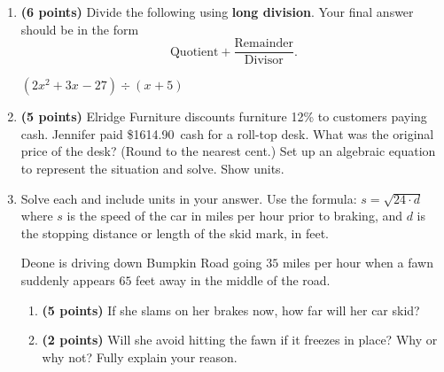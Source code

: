 \documentclass[12pt]{amsart}
\begin{document}
\begin{enumerate}
  
\vfill \vfill \vfill
\def \a{5}\def \b{2}\def \c{-7}\def \r{8}\def \monicpol{x^{}+5}\def \longnbad{2x^{2}+3x^{}-27}\def \anspol{2x^{}-7}
\item {\bf (6 points)} 
 Divide the following using {\bf long division}. Your final answer should be in the form $$ \text{Quotient} + \dfrac{\text{Remainder}}{\text{Divisor}}.$$

\vspace{3mm}

$(\longnbad) \div (\monicpol)$

\vfill  \vfill \vfill
\newpage\def \discount{12}\def \paid{1614.90}\def \rainy{10.76}\def \orcost{1835.11}\def \purcost{1441.88}\def \orrainy{12.23}
\item {\bf (5 points)} 
 Elridge Furniture discounts furniture \discount\% to customers paying cash. Jennifer paid \$\paid\ cash for a roll-top desk. What was the original price of the desk? (Round to the nearest cent.) Set up an algebraic equation to represent the situation and solve. Show units.

\vfill 
\def \insvar{24}\def \d{65}\def \zerospeed{39.5}\def \slimit{35}\def \s{53}\def \skidd{117.042}\def \safed{51.042}\def \rsafed{51}

 
\item Solve each and include units in your answer. Use the formula: $s = \sqrt{\insvar \cdot d}$ where $s$ is the speed of the car in miles per hour prior to braking, and $d$ is the stopping distance or length of the skid mark, in feet. 

\vspace{3mm}

Deone is driving down Bumpkin Road going $\slimit$ miles per hour when a fawn suddenly appears $\d$ feet away in the middle of the road. \begin{enumerate}
\item {\bf (5 points)} If she slams on her brakes now, how far will her car skid? \vspace{4cm}
\item {\bf (2 points)} Will she avoid hitting the fawn if it freezes in place? Why or why not? Fully explain your reason. \vspace{3cm}
\end{enumerate}



\end{enumerate}
\end{document}
